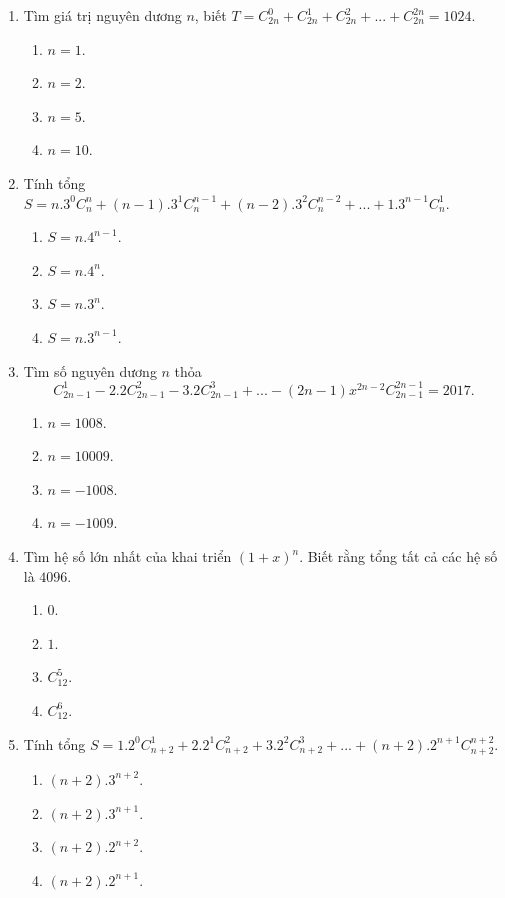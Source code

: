 \begin{enumerate}[label=\textbf{Câu \arabic*.},align=left,left=0cm..0cm,itemindent=*]
\begin{enumerate}[label=\textbf{\Alph*.},align=left,left=1cm..0cm,itemindent=*]
	\end{enumerate}
	\item Tìm giá trị nguyên dương $n$, biết $T=C_{2n}^0+C_{2n}^1+C_{2n}^2+...+C_{2n}^{2n}=1024$.
	\begin{enumerate}[label=\textbf{\Alph*.},align=left,left=1cm..0cm,itemindent=*]
		\item $n=1$. \item $n=2$. \item $n=5$. \item $n=10$.
	\end{enumerate}
	\item Tính tổng $S=n.3^0C_n^n+(n-1).3^1C_n^{n-1}+(n-2).3^2C_n^{n-2}+...+1.3^{n-1}C_n^1$.
	\begin{enumerate}[label=\textbf{\Alph*.},align=left,left=1cm..0cm,itemindent=*]
		\item $S=n.4^{n-1}$. \item $S=n.4^n$. \item $S=n.3^n$. \item $S=n.3^{n-1}$.
	\end{enumerate}
	\item Tìm số nguyên dương $n$ thỏa $$C_{2n-1}^1-2.2C_{2n-1}^2-3.2C_{2n-1}^3+...-(2n-1)x^{2n-2}C_{2n-1}^{2n-1}=2017.$$
	\begin{enumerate}[label=\textbf{\Alph*.},align=left,left=1cm..0cm,itemindent=*]
		\item $n=1008$. \item $n=10009$. \item $n=-1008$. \item $n=-1009$.
	\end{enumerate}
	\item Tìm hệ số lớn nhất của khai triển $(1+x)^n$. Biết rằng tổng tất cả các hệ số là $4096$.
	\begin{enumerate}[label=\textbf{\Alph*.},align=left,left=1cm..0cm,itemindent=*]
		\item $0$. \item $1$. \item $C_{12}^5$. \item $C_{12}^6$.
	\end{enumerate}
	\item Tính tổng $S=1.2^0C_{n+2}^1+2.2^1C_{n+2}^2+3.2^2C_{n+2}^3+...+(n+2).2^{n+1}C_{n+2}^{n+2}$.
	\begin{enumerate}[label=\textbf{\Alph*.},align=left,left=1cm..0cm,itemindent=*]
		\item $(n+2).3^{n+2}$. \item $(n+2).3^{n+1}$. \item $(n+2).2^{n+2}$. \item $(n+2).2^{n+1}$.
	\end{enumerate}
\end{enumerate}\par

